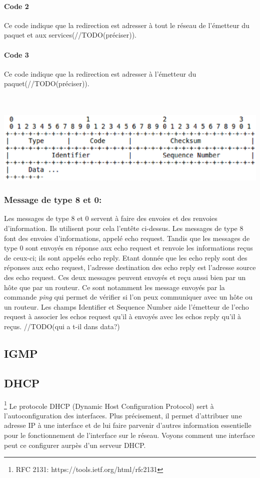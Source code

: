 \documentclass[twoside,openright,a4paper,11pt,french]{article}
\begin{document}
\paragraph{Code 2}
Ce code indique que la redirection est adresser à tout le réseau de l'émetteur du paquet et aux services(//TODO(préciser)).
\paragraph{Code 3}
Ce code indique que la redirection est adresser à l'émetteur du paquet(//TODO(préciser)).

\\
\\
\includegraphics[width=15cm]{./pics/header3.eps}
\\

\subsubsection{Message de type 8 et 0:}
Les messages de type 8 et 0 servent à faire des envoies et des renvoies d'information. Ils utilisent pour cela l'entête ci-dessus. Les messages de type 8 font des envoies d'informations, appelé echo request. Tandis que les messages de type 0 sont envoyés en réponse aux echo request et renvoie les informations reçus de ceux-ci; ils sont appelés echo reply. Etant donnée que les echo reply sont des réponses aux echo request, l'adresse destination des echo reply est l'adresse source des echo request. Ces deux messages peuvent envoyés et reçu aussi bien par un hôte que par un routeur. Ce sont notamment les message envoyés par la commande {\it ping} qui permet de vérifier si l'on peux communiquer avec un hôte ou un routeur.
Les champs Identifier et Sequence Number aide l'émetteur de l'echo request à associer les echos request qu'il à envoyés avec les echos reply qu'il à reçus.
//TODO(qui a t-il dans data?)
\subsection{IGMP}
\subsection{DHCP}
\footnote{RFC 2131: https://tools.ietf.org/html/rfc2131}
Le protocole DHCP (Dynamic Host Configuration Protocol) sert à l'autoconfiguration des interfaces. Plus précisement, il  permet d'attribuer une adresse IP à une interface et de lui faire parvenir d'autres information essentielle pour le fonctionnement de l'interface sur le réseau.
Voyons comment une interface peut ce configurer aurpès d'un serveur DHCP.
\end{document}
